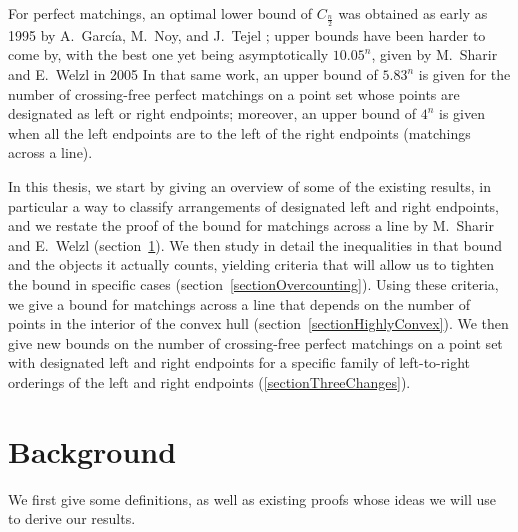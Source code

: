 \documentclass[10pt, a4paper, twoside]{basestyle}
\begin{document}
For perfect matchings, an optimal lower bound of $C_{\frac n 2}$ was obtained as early as 1995 by A.~García,
M.~Noy, and J.~Tejel \cite{GarciaNoyTejel2000}; upper bounds have been harder to come by, with the best one
yet being asymptotically $10.05^n$, given by M.~Sharir and E.~Welzl in 2005 \cite{SharirWelzl2006}
In that same work, an upper bound of $5.83^n$ is given for the number of crossing-free perfect matchings on a
point set whose points are designated as left or right endpoints; moreover, an upper bound of $4^n$ is given
when all the left endpoints are to the left of the right endpoints (matchings across a line).

In this thesis, 
we start by giving an overview of some of the existing results, in particular a way
to classify arrangements of designated left and right endpoints,
and we restate the proof of the bound for matchings across a line by M.~Sharir and E.~Welzl
(section~\ref{sectionBackground}).
We then study in detail the inequalities in that bound and the objects it actually counts,
yielding criteria that will allow us to tighten the bound in specific cases (section~\ref{sectionOvercounting}).
Using these criteria, we give a bound for
matchings across a line that depends on the number of points in the interior of the convex hull
(section~\ref{sectionHighlyConvex}).
We then give new bounds on the number of crossing-free perfect matchings on a point set with designated left and
right endpoints for a specific family of left-to-right orderings of the left and right endpoints
(\ref{sectionThreeChanges}). 
\section{Background}
\label{sectionBackground}
We first give some definitions, as well as existing proofs whose ideas we will use to derive our results.
\end{document}
